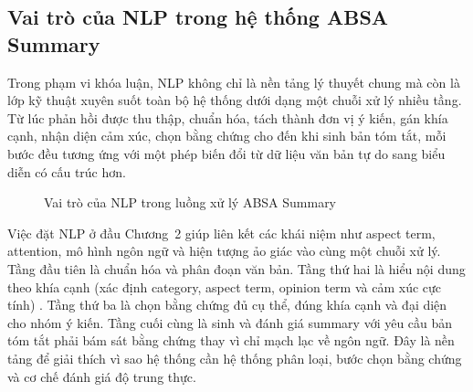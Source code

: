 \subsection{Vai trò của NLP trong hệ thống ABSA Summary}
\label{subsec:chap2-nlp-role-absa-summary}

Trong phạm vi khóa luận, NLP không chỉ là nền tảng lý thuyết chung mà còn là lớp kỹ thuật xuyên suốt toàn bộ hệ thống dưới dạng một chuỗi xử lý nhiều tầng. Từ lúc phản hồi được thu thập, chuẩn hóa, tách thành đơn vị ý kiến, gán khía cạnh, nhận diện cảm xúc, chọn bằng chứng cho đến khi sinh bản tóm tắt, mỗi bước đều tương ứng với một phép biến đổi từ dữ liệu văn bản tự do sang biểu diễn có cấu trúc hơn.

\begin{figure}[htbp]
\centering
{}
\caption{Vai trò của NLP trong luồng xử lý ABSA Summary}
\label{fig:chap2-nlp-role}
\end{figure}

Việc đặt NLP ở đầu Chương~2 giúp liên kết các khái niệm như aspect term, attention, mô hình ngôn ngữ và hiện tượng ảo giác vào cùng một chuỗi xử lý. Tầng đầu tiên là chuẩn hóa và phân đoạn văn bản. Tầng thứ hai là hiểu nội dung theo khía cạnh (xác định category, aspect term, opinion term và cảm xúc cực tính) \cite{pontiki2014semeval}. Tầng thứ ba là chọn bằng chứng đủ cụ thể, đúng khía cạnh và đại diện cho nhóm ý kiến. Tầng cuối cùng là sinh và đánh giá summary với yêu cầu bản tóm tắt phải bám sát bằng chứng thay vì chỉ mạch lạc về ngôn ngữ. Đây là nền tảng để giải thích vì sao hệ thống cần hệ thống phân loại, bước chọn bằng chứng và cơ chế đánh giá độ trung thực.
